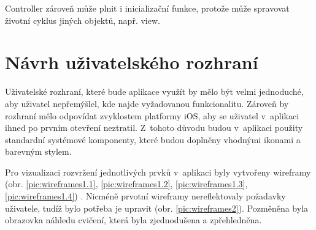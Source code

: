 \documentclass[thesis=B,czech]{FITthesis}[2012/06/26]
\begin{document}
	Controller zároveň může plnit i inicializační funkce, protože může spravovat životní cyklus jiných objektů, např. view.

	\section{Návrh uživatelského rozhraní}

	Uživatelské rozhraní, které bude aplikace využít by mělo být velmi jednoduché, aby uživatel nepřemýšlel, kde najde vyžadovanou funkcionalitu. Zároveň by rozhraní mělo odpovídat zvyklostem platformy iOS, aby se uživatel v~aplikaci ihned po prvním otevření neztratil. Z~tohoto důvodu budou v~aplikaci použity standardní systémové komponenty, které budou doplněny vhodnými ikonami a barevným stylem.

	Pro vizualizaci rozvržení jednotlivých prvků v~aplikaci byly vytvořeny wireframy (obr. \ref{pic:wireframes1.1}, \ref{pic:wireframes1.2}, \ref{pic:wireframes1.3}, \ref{pic:wireframes1.4}) \cite{moqupsOnline}. Nicméně prvotní wireframy nereflektovaly požadavky uživatele, tudíž bylo potřeba je upravit (obr. \ref{pic:wireframes2}). Pozměněna byla obrazovka náhledu cvičení, která byla zjednodušena a zpřehledněna.
\end{document}
